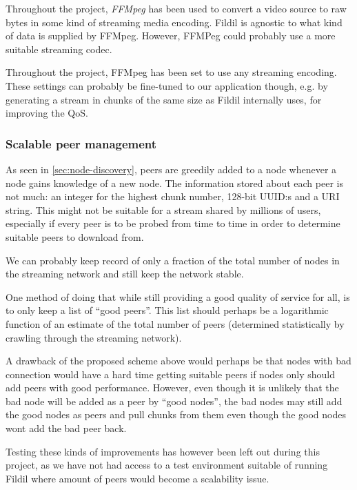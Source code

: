 \documentclass[10pt, a4paper]{article}
\begin{document}
Throughout the project, \emph{FFMpeg} has been used to convert a video
source to raw bytes in some kind of streaming media encoding. Fildil
is agnostic to what kind of data is supplied by FFMpeg. However,
FFMPeg could probably use a more suitable streaming codec.

Throughout the project, FFMpeg has been set to use any streaming
encoding. These settings can probably be fine-tuned to our application
though, e.g. by generating a stream in chunks of the same size as
Fildil internally uses, for improving the QoS.

\subsubsection{Scalable peer management}

As seen in \autoref{sec:node-discovery}, peers are greedily added to a
node whenever a node gains knowledge of a new node. The information
stored about each peer is not much: an integer for the highest chunk
number, 128-bit UUID:s and a URI string. This might not be suitable
for a stream shared by millions of users, especially if every peer is
to be probed from time to time in order to determine suitable peers to
download from.

We can probably keep record of only a fraction of the total number of
nodes in the streaming network and still keep the network stable.

One method of doing that while still providing a good quality of
service for all, is to only keep a list of ``good peers''. This list
should perhaps be a logarithmic function of an estimate of the total
number of peers (determined statistically by crawling through the
streaming network).

A drawback of the proposed scheme above would perhaps be that nodes
with bad connection would have a hard time getting suitable peers if
nodes only should add peers with good performance. However, even
though it is unlikely that the bad node will be added as a peer by
``good nodes'', the bad nodes may still add the good nodes as peers
and pull chunks from them even though the good nodes wont add the bad
peer back.

Testing these kinds of improvements has however been left out during
this project, as we have not had access to a test environment suitable
of running Fildil where amount of peers would become a scalability
issue.

\newpage


\end{document}
